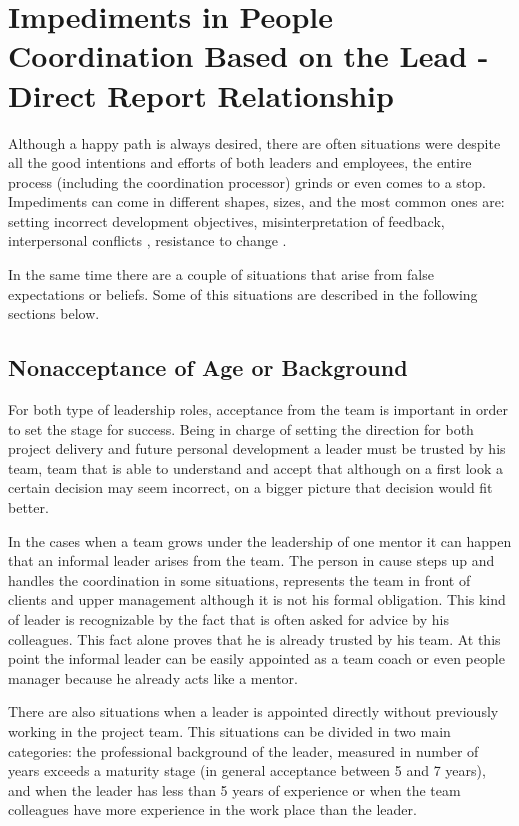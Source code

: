 \chapter{Impediments in People Coordination Based on the Lead - Direct Report Relationship}
\label{chapter:impediments}

Although a happy path is always desired, there are often situations were despite all the good intentions and efforts of both leaders and employees, the entire process (including the coordination processor) grinds or even comes to a stop. Impediments can come in different shapes, sizes, and the most common ones are: setting incorrect development objectives, misinterpretation of feedback, interpersonal conflicts \cite{abur-pm}, resistance to change \cite{abur-tl}. 

In the same time there are a couple of situations that arise from false expectations or beliefs. Some of this situations are described in the following sections below.

\section{Nonacceptance of Age or Background}
\label{sec:unnaceptance}
For both type of leadership roles, acceptance from the team is important in order to set the stage for success. Being in charge of setting the direction for both project delivery and future personal development a leader must be trusted by his team, team that is able to understand and accept that although on a first look a certain decision may seem incorrect, on a bigger picture that decision would fit better. 

In the cases when a team grows under the leadership of one mentor it can happen that an informal leader arises from the team. The person in cause steps up and handles the coordination in some situations, represents the team in front of clients and upper management although it is not his formal obligation. This kind of leader is recognizable by the fact that is often asked for advice by his colleagues. This fact alone proves that he is already trusted by his team. At this point the informal leader can be easily appointed as a team coach or even people manager because he already acts like a mentor.

There are also situations when a leader is appointed directly without previously working in the project team. This situations can be divided in two main categories: the professional background of the leader, measured in number of years exceeds a maturity stage (in general acceptance between 5 and 7 years), and when the leader has less than 5 years of experience or when the team colleagues have more experience in the work place than the leader.

